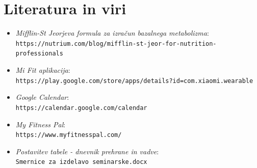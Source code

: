 \documentclass{article}
\begin{document}
\section{Literatura in viri}

\begin{itemize}
  \item \textit{Mifflin-St Jeorjeva formula za izračun bazalnega metabolizma}: \\
  \texttt{https://nutrium.com/blog/mifflin-st-jeor-for-nutrition-professionals}

  \item \textit{Mi Fit aplikacija}: \\
  \texttt{https://play.google.com/store/apps/details?id=com.xiaomi.wearable}

  \item \textit{Google Calendar}: \\
  \texttt{https://calendar.google.com/calendar}

  \item \textit{My Fitness Pal}: \\
  \texttt{https://www.myfitnesspal.com/}

  \item \textit{Postavitev tabele - dnevnik prehrane in vadve}: \\
  \texttt{Smernice za izdelavo seminarske.docx}
\end{itemize}
\end{document}

